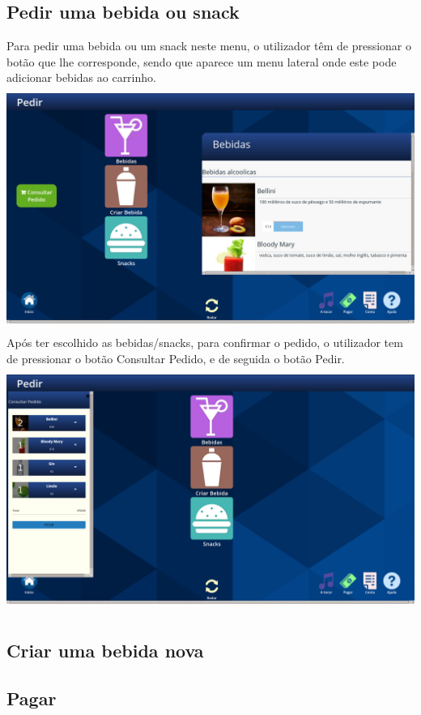 \documentclass{article}
\begin{document}
\subsection{Pedir uma bebida ou snack}
Para pedir uma bebida ou um snack neste menu, o utilizador têm de pressionar o botão que lhe corresponde, sendo que aparece um menu lateral onde este pode adicionar bebidas ao carrinho.\\
\includegraphics[width=15cm, height=8cm]{user_manual_images/drinks_submenu.png} Após ter escolhido as bebidas/snacks, para confirmar o pedido, o utilizador tem de pressionar o botão Consultar Pedido, e de seguida o botão Pedir.\\
\includegraphics[width=15cm, height=8cm]{user_manual_images/ask_order_submenu.png}
\subsection{Criar uma bebida nova}
\subsection{Pagar}
\end{document}
